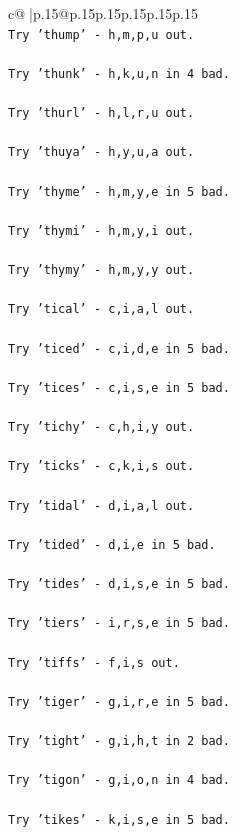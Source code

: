 \documentclass{article}
\begin{document}
{\begin{supertabular}{c@{$\;$}|p{.15\linewidth}@{}p{.15\linewidth}p{.15\linewidth}p{.15\linewidth}p{.15\linewidth}p{.15\linewidth}}
{{{\\ 
\texttt{Try 'thump' {-} h,m,p,u out.} \\
\\ 
\texttt{Try 'thunk' {-} h,k,u,n in 4 bad.} \\
\\ 
\texttt{Try 'thurl' {-} h,l,r,u out.} \\
\\ 
\texttt{Try 'thuya' {-} h,y,u,a out.} \\
\\ 
\texttt{Try 'thyme' {-} h,m,y,e in 5 bad.} \\
\\ 
\texttt{Try 'thymi' {-} h,m,y,i out.} \\
\\ 
\texttt{Try 'thymy' {-} h,m,y,y out.} \\
\\ 
\texttt{Try 'tical' {-} c,i,a,l out.} \\
\\ 
\texttt{Try 'ticed' {-} c,i,d,e in 5 bad.} \\
\\ 
\texttt{Try 'tices' {-} c,i,s,e in 5 bad.} \\
\\ 
\texttt{Try 'tichy' {-} c,h,i,y out.} \\
\\ 
\texttt{Try 'ticks' {-} c,k,i,s out.} \\
\\ 
\texttt{Try 'tidal' {-} d,i,a,l out.} \\
\\ 
\texttt{Try 'tided' {-} d,i,e in 5 bad.} \\
\\ 
\texttt{Try 'tides' {-} d,i,s,e in 5 bad.} \\
\\ 
\texttt{Try 'tiers' {-} i,r,s,e in 5 bad.} \\
\\ 
\texttt{Try 'tiffs' {-} f,i,s out.} \\
\\ 
\texttt{Try 'tiger' {-} g,i,r,e in 5 bad.} \\
\\ 
\texttt{Try 'tight' {-} g,i,h,t in 2 bad.} \\
\\ 
\texttt{Try 'tigon' {-} g,i,o,n in 4 bad.} \\
\\ 
\texttt{Try 'tikes' {-} k,i,s,e in 5 bad.} \\
}}}
\end{supertabular}}
\end{document}

